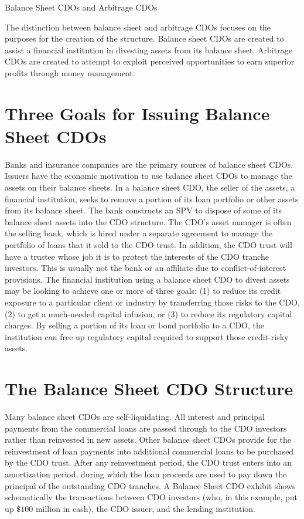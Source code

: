 \documentclass[11pt]{article}
\begin{document}
Balance Sheet CDOs and Arbitrage CDOs

The distinction between balance sheet and arbitrage CDOs focuses on the purposes for the creation of the structure. Balance sheet CDOs are created to assist a financial institution in divesting assets from its balance sheet. Arbitrage CDOs are created to attempt to exploit perceived opportunities to earn superior profits through money management.

\section*{Three Goals for Issuing Balance Sheet CDOs}
Banks and insurance companies are the primary sources of balance sheet CDOs. Issuers have the economic motivation to use balance sheet CDOs to manage the assets on their balance sheets. In a balance sheet CDO, the seller of the assets, a financial institution, seeks to remove a portion of its loan portfolio or other assets from its balance sheet. The bank constructs an SPV to dispose of some of its balance sheet assets into the CDO structure. The CDO's asset manager is often the selling bank, which is hired under a separate agreement to manage the portfolio of loans that it sold to the CDO trust. In addition, the CDO trust will have a trustee whose job it is to protect the interests of the CDO tranche investors. This is usually not the bank or an affiliate due to conflict-of-interest provisions. The financial institution using a balance sheet CDO to divest assets may be looking to achieve one or more of three goals: (1) to reduce its credit exposure to a particular client or industry by transferring those risks to the CDO, (2) to get a much-needed capital infusion, or (3) to reduce its regulatory capital charges. By selling a portion of its loan or bond portfolio to a CDO, the institution can free up regulatory capital required to support those credit-risky assets.

\section*{The Balance Sheet CDO Structure}
Many balance sheet CDOs are self-liquidating. All interest and principal payments from the commercial loans are passed through to the CDO investors rather than reinvested in new assets. Other balance sheet CDOs provide for the reinvestment of loan payments into additional commercial loans to be purchased by the CDO trust. After any reinvestment period, the CDO trust enters into an amortization period, during which the loan proceeds are used to pay down the principal of the outstanding CDO tranches. A Balance Sheet CDO exhibit shows schematically the transactions between CDO investors (who, in this example, put up $\$ 100$ million in cash), the CDO issuer, and the lending institution.
\end{document}
